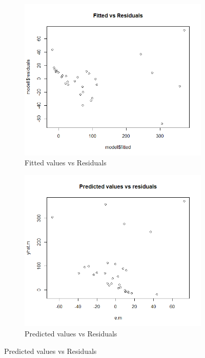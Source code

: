 \documentclass{article}
\begin{document}
\begin{figure}
 \centering
  \begin{subfigure}[b]{0.5\textwidth}
      \centering
        \includegraphics[width=1.4\textwidth]{Rplotf.png}
       \caption{Fitted values vs Residuals}
       \label{fig.1}
 \end{subfigure}
 \begin{subfigure}[b]{0.5\textwidth}
      \centering
      \includegraphics[width=1.4\textwidth]{Rplotp.png}
      \caption{Predicted values vs Residuals}
      \label{fig.2}
 \end{subfigure}

\end{figure}
\end{document}
